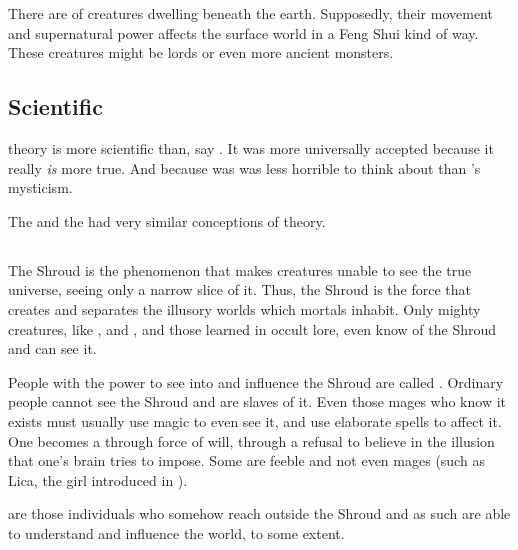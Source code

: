 There are  of creatures dwelling beneath the earth. Supposedly, their movement and supernatural power affects the surface world in a Feng Shui kind of way. These creatures might be \trueophidian{} lords or even more ancient monsters. 









\subsection{Scientific}
\Matrix theory is more scientific than, say . 
It was more universally accepted because it really \emph{is} more true. 
And because was was less horrible to think about than \Sethicus's \xs mysticism. 

The \dragons and the \resphain had very similar conceptions of \nexus theory. 









\subsection{\Vertex}
\index{\nexus}
The Shroud is the phenomenon that makes creatures unable to see the true universe, seeing only a narrow slice of it. Thus, the Shroud is the force that creates and separates the illusory worlds which mortals inhabit. Only mighty creatures, like \dragons, \banes{} and \resphain, and those learned in occult lore, even know of the Shroud and can see it.

\index{\vertex}
People with the power to see into and influence the Shroud are called \vertices. 
Ordinary people cannot see the Shroud and are slaves of it. 
Even those mages who know it exists must usually use magic to even see it, and use elaborate spells to affect it. 
One becomes a \vertex{} through force of will, through a refusal to believe in the illusion that one's brain tries to impose. 
Some \vertices{} are feeble and not even mages (such as Lica, the  girl introduced in \emph{\LicaBook}). 

\Vertices{} are those individuals who somehow reach outside the Shroud and as such are able to understand and influence the world, to some extent. 

